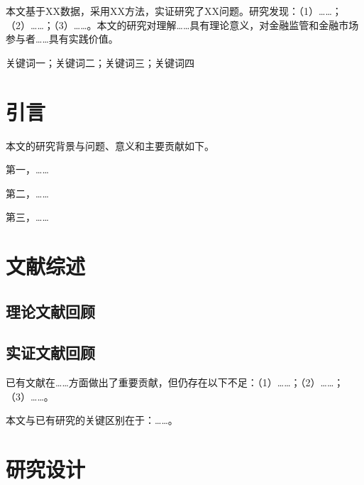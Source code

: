 \documentclass[10pt, UTF8, twocolumn]{ctexart}
\begin{document}



\begin{jryjabstract}
本文基于XX数据，采用XX方法，实证研究了XX问题。研究发现：（1）……；（2）……；（3）……。本文的研究对理解……具有理论意义，对金融监管和金融市场参与者……具有实践价值。
\end{jryjabstract}

\begin{jryjkeywords}
关键词一；关键词二；关键词三；关键词四
\end{jryjkeywords}


\section{引言}
\label{sec:intro}

本文的研究背景与问题、意义和主要贡献如下。

第一，……

第二，……

第三，……

\section{文献综述}
\label{sec:lit}

\subsection{理论文献回顾}

\subsection{实证文献回顾}
已有文献在……方面做出了重要贡献，但仍存在以下不足：（1）……；（2）……；（3）……。

本文与已有研究的关键区别在于：……。

\section{研究设计}
\label{sec:design}
\end{document}
